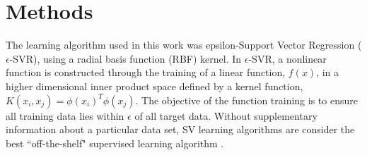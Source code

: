 \documentclass[12]{article}
\begin{document}
\section*{Methods}

\noindent The learning algorithm used in this work was epsilon-Support Vector Regression
($\epsilon$-SVR), using a radial basis function (RBF) kernel. In $\epsilon$-SVR,
a nonlinear function is constructed through the training of a linear
function, $f(x)$, in a higher dimensional inner product space
defined by a kernel function, $K(x_i,x_j)=\phi (x_i)^T \phi (x_j)$. The
objective of the function training is to ensure all training data lies
within $\epsilon$ of all target data. Without supplementary information about a
particular data set, SV learning algorithms are consider the best
``off-the-shelf" supervised learning algorithm \cite{class_svm}. \\
\end{document}
